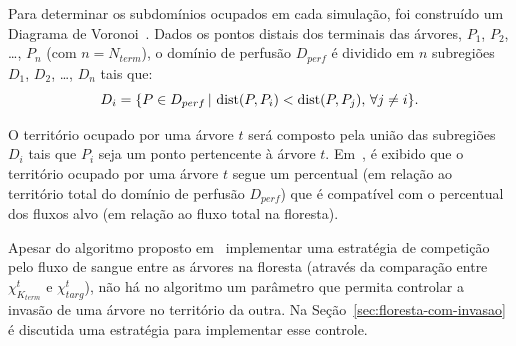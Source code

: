 Para determinar os subdomínios ocupados em cada simulação, foi 
construído um Diagrama de Voronoi~\cite{Aurenhammer2004}. Dados os pontos distais dos terminais das 
árvores, $P_1$, $P_2$, \ldots, $P_n$ (com $n = N_{term}$),
o domínio de perfusão $D_{perf}$ é dividido em 
$n$ subregiões $D_1$, $D_2$, \ldots, $D_n$ tais que:
\begin{equation}
 D_i = \{P\in D_{perf} \,|\, \operatorname{dist}(P,P_i) < \operatorname{dist}(P, P_j),\, \forall j\neq i\}\textrm{.}
 \label{def:diagrama-voronoi}
\end{equation}

O território ocupado por uma árvore $t$ será composto pela união das subregiões 
$D_i$ tais que $P_i$ seja um ponto pertencente à árvore $t$. Em~\cite{Jaquet2019}, 
é exibido que o território ocupado por uma árvore $t$ segue um percentual (em relação 
ao território total do domínio de perfusão $D_{perf}$) que é compatível com o percentual 
dos fluxos alvo (em relação ao fluxo total na floresta).

Apesar do algoritmo proposto em~\cite{Jaquet2019} implementar uma estratégia de competição 
pelo fluxo de sangue entre as árvores na floresta (através da comparação 
entre $\chi_{K_{term}}^t$ e $\chi_{targ}^t$), não há no algoritmo um parâmetro 
que permita controlar a invasão de uma árvore no território da outra. 
Na Seção~\ref{sec:floresta-com-invasao} é discutida uma estratégia para
implementar esse controle.